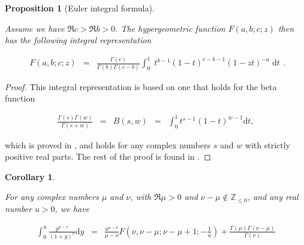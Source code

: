 \documentclass{jams-l}
\newtheorem{proposition}[theorem]{Proposition}
\newtheorem{corollary}[theorem]{Corollary}
\theoremstyle{definition}
\theoremstyle{remark}
\numberwithin{equation}{section}
\begin{document}
            \begin{proposition}[Euler integral formula]
            \label{PropEulerIntegralFormula}
        
                Assume we have $\Re c > \Re b > 0$. The hypergeometric function $F \left( a, b; c; z \right)$ then has the following integral representation
            
                \[ \begin{array}{lll}
                        F \left( a, b; c; z \right) & = & \frac{\Gamma \left( c \right)}{\Gamma \left( b \right) \Gamma \left( c - b \right)} \int_0^1 \; t^{b-1} \left( 1 - t \right)^{c - b - 1} \left( 1 - zt \right)^{-a} \; \mathrm{d}t
                    \end{array} . \]
        
            \end{proposition}
            
            \begin{proof}
            
                This integral representation is based on one that holds for the beta function
                
                \[ \begin{array}{lllll}
                        \frac{\Gamma \left( s \right) \Gamma \left( w \right)}{\Gamma \left( s+w \right)} & = & B \left( s, w \right) & = & \int_0^1 t^{s-1} \left( 1-t \right)^{w-1} \mathrm{d}t,
                    \end{array} \]
                
                \noindent which is proved in \cite[Sec. 2.1.6]{MR1429619}, and holds for any complex numbers $s$ and $w$ with strictly positive real parts. The rest of the proof is found in \cite[Sec. 5.9.4]{MR1429619}.
            
            \end{proof}
        
            \begin{corollary}
            \label{CorIntegralFormula}
        
                For any complex numbers $\mu$ and $\nu$, with $\Re \mu > 0$ and $\nu - \mu \not \in \mathbb{Z}_{\leqslant 0}$, and any real number $u > 0$, we have
            
                \[ \begin{array}{lll}
                        \int_0^u \frac{y^{\mu-1}}{\left( 1 + y \right)^{\nu}} \mathrm{d}y & = & \frac{u^{\mu - \nu}}{\mu - \nu} F \left( \nu, \nu - \mu; \nu - \mu + 1; - \frac{1}{u} \right) + \frac{\Gamma \left( \mu \right) \Gamma \left( \nu - \mu \right)}{\Gamma \left( \nu \right)}
                    \end{array} \]
        
            \end{corollary}
        
\end{document}
